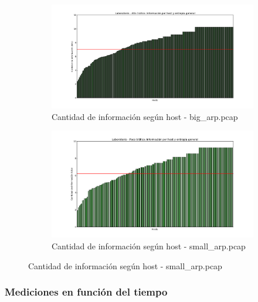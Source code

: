 \begin{figure}[H]
        \begin{subfigure}[H]{0.5\textwidth}
                \centering
                \includegraphics[width=1\textwidth]{graficos/infoHost_laboBig.png}
                \caption{Cantidad de informaci\'on seg\'un host - big\_arp.pcap}
                \label{fig:info3}
        \end{subfigure}
        \begin{subfigure}[H]{0.5\textwidth}
                \centering
                \includegraphics[width=1\textwidth]{graficos/infoHost_laboSmall.png}
                \caption{Cantidad de informaci\'on seg\'un host - small\_arp.pcap}
                \label{fig:info4}
        \end{subfigure}
\end{figure}


\subsubsection{Mediciones en funci\'on del tiempo}

